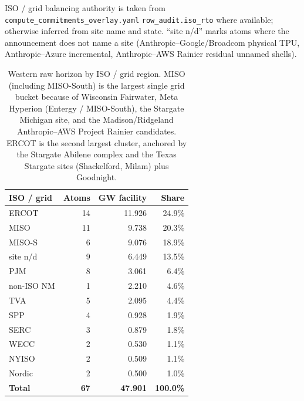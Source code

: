 \noindent ISO / grid balancing authority is taken from \texttt{compute\_commitments\_overlay.yaml} \texttt{row\_audit.iso\_rto} where available; otherwise inferred from site name and state. ``site n/d'' marks atoms where the announcement does not name a site (Anthropic--Google/Broadcom physical TPU, Anthropic--Azure incremental, Anthropic--AWS Rainier residual unnamed shells).
\begin{table}[H]
\centering\small
\begin{tabular}{@{}lrrr@{}}
\toprule
\textbf{ISO / grid} & \textbf{Atoms} & \textbf{GW facility} & \textbf{Share} \\
\midrule

ERCOT & 14 & 11.926 & 24.9\% \\

MISO & 11 & 9.738 & 20.3\% \\

MISO-S & 6 & 9.076 & 18.9\% \\

site n/d & 9 & 6.449 & 13.5\% \\

PJM & 8 & 3.061 & 6.4\% \\

non-ISO NM & 1 & 2.210 & 4.6\% \\

TVA & 5 & 2.095 & 4.4\% \\

SPP & 4 & 0.928 & 1.9\% \\

SERC & 3 & 0.879 & 1.8\% \\

WECC & 2 & 0.530 & 1.1\% \\

NYISO & 2 & 0.509 & 1.1\% \\

Nordic & 2 & 0.500 & 1.0\% \\

\midrule\textbf{Total} & \textbf{67} & \textbf{47.901} & \textbf{100.0\%} \\

\bottomrule
\end{tabular}
\caption{Western raw horizon by ISO / grid region. MISO (including MISO-South) is the largest single grid bucket because of Wisconsin Fairwater, Meta Hyperion (Entergy / MISO-South), the Stargate Michigan site, and the Madison/Ridgeland Anthropic--AWS Project Rainier candidates. ERCOT is the second largest cluster, anchored by the Stargate Abilene complex and the Texas Stargate sites (Shackelford, Milam) plus Goodnight.}
\end{table}

